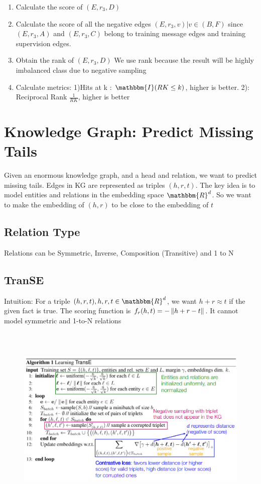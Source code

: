     \begin{enumerate}
        \item Calculate the score of $(E, r_3, D)$
        \item Calculate the score of all the negative edges $(E, r_3, v)|v\in (B,F)$ since $(E,r_3,A)$ and $(E,r_3,C)$ belong to training message edges and training supervision edges. 
        \item Obtain the rank of $(E,r_3,D)$ We use rank because the result will be highly imbalanced class due to negative sampling
        \item Calculate metrics: 1)Hits at k : $\mathbbm{I}(RK \leq k )$, higher is better. 2): Reciprocal Rank $\frac{1}{RK}$, higher is better 
    \end{enumerate}
    
\section{Knowledge Graph: Predict Missing Tails}
Given an enormous knowledge graph, and a head and relation, we want to predict missing tails. Edges in KG are represented as triples $(h, r, t)$. The key idea is to model entities and relations in the embedding space $\mathbbm{R}^d$. So we want to make the embedding of $(h, r)$ to be close to the embedding of $t$

\subsection{Relation Type} 
Relations can be Symmetric, Inverse, Composition (Transitive) and 1 to N 

\subsection{TranSE} 
Intuition: For a triple $(h, r, t), h, r, t \in \mathbbm{R}^d$, we want $h + r \approx t$ if the given fact is true. The scoring function is $f_r(h,t) = - \left\lVert h + r - t \right\rVert$. It cannot model symmetric and 1-to-N relations

\begin{figure}[H]
\includegraphics[width=12cm, height=9cm]{images/005_TransE.png}
\end{figure}

